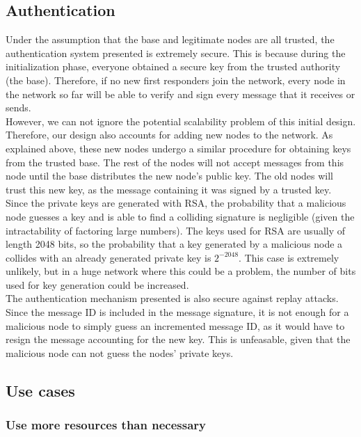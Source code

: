 \documentclass[letterpaper]{article}
\begin{document}
\subsection{Authentication}
Under the assumption that the base and legitimate nodes are all trusted, the authentication system presented is extremely secure. This is because during the initialization phase, everyone obtained a secure key from the trusted authority (the base). Therefore, if no new first responders join the network, every node in the network so far will be able to verify and sign every message that it receives or sends. \\

However, we can not ignore the potential scalability problem of this initial design. Therefore, our design also accounts for adding new nodes to the network. As explained above, these new nodes undergo a similar procedure for obtaining keys from the trusted base. The rest of the nodes will not accept messages from this node until the base distributes the new node's public key. The old nodes will trust this new key, as the message containing it was signed by a trusted key.
\\

Since the private keys are generated with RSA, the probability that a malicious node guesses a key and is able to find a colliding signature is negligible (given the intractability of factoring large numbers). The keys used for RSA are usually of length 2048 bits, so the probability that a key generated by a malicious node a collides with an already generated private key is $2^{-2048}$. This case is extremely unlikely, but in a huge network where this could be a problem, the number of bits used for key generation could be increased.\\

The authentication mechanism presented is also secure against replay attacks. Since the message ID is included in the message signature, it is not enough for a malicious node to simply guess an incremented message ID, as it would have to resign the message accounting for the new key. This is unfeasable, given that the malicious node can not guess the nodes' private keys.

\subsection{Use cases}

\subsubsection{Use more resources than necessary}
\end{document}

